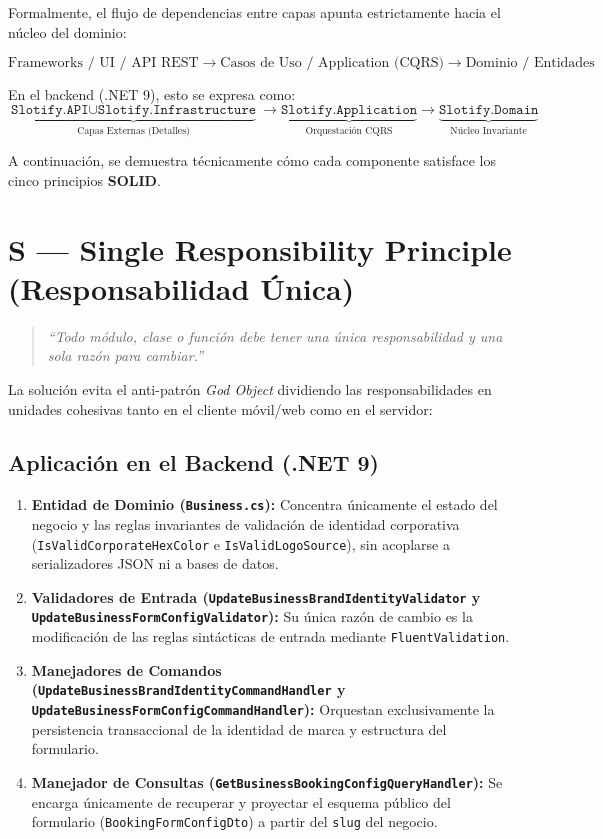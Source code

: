\documentclass[11pt,a4paper]{article}
\begin{document}
Formalmente, el flujo de dependencias entre capas apunta estrictamente hacia el núcleo del dominio:

\[
\text{Frameworks / UI / API REST} \longrightarrow \text{Casos de Uso / Application (CQRS)} \longrightarrow \text{Dominio / Entidades}
\]

En el backend (.NET 9), esto se expresa como:
\[
\underbrace{\texttt{Slotify.API} \cup \texttt{Slotify.Infrastructure}}_{\text{Capas Externas (Detalles)}}
\longrightarrow
\underbrace{\texttt{Slotify.Application}}_{\text{Orquestación CQRS}}
\longrightarrow
\underbrace{\texttt{Slotify.Domain}}_{\text{Núcleo Invariante}}
\]

A continuación, se demuestra técnicamente cómo cada componente satisface los cinco principios \textbf{SOLID}.

\section{S --- Single Responsibility Principle (Responsabilidad Única)}

\begin{quote}
\textit{``Todo módulo, clase o función debe tener una única responsabilidad y una sola razón para cambiar.''}
\end{quote}

La solución evita el anti-patrón \textit{God Object} dividiendo las responsabilidades en unidades cohesivas tanto en el cliente móvil/web como en el servidor:

\subsection{Aplicación en el Backend (.NET 9)}
\begin{enumerate}[label=\textbf{\arabic*.}]
    \item \textbf{Entidad de Dominio (\texttt{Business.cs}):} Concentra únicamente el estado del negocio y las reglas invariantes de validación de identidad corporativa (\texttt{IsValidCorporateHexColor} e \texttt{IsValidLogoSource}), sin acoplarse a serializadores JSON ni a bases de datos.
    \item \textbf{Validadores de Entrada (\texttt{UpdateBusinessBrandIdentityValidator} y \texttt{UpdateBusinessFormConfigValidator}):} Su única razón de cambio es la modificación de las reglas sintácticas de entrada mediante \texttt{FluentValidation}.
    \item \textbf{Manejadores de Comandos (\texttt{UpdateBusinessBrandIdentityCommandHandler} y \texttt{UpdateBusinessFormConfigCommandHandler}):} Orquestan exclusivamente la persistencia transaccional de la identidad de marca y estructura del formulario.
    \item \textbf{Manejador de Consultas (\texttt{GetBusinessBookingConfigQueryHandler}):} Se encarga únicamente de recuperar y proyectar el esquema público del formulario (\texttt{BookingFormConfigDto}) a partir del \texttt{slug} del negocio.
\end{enumerate}
\end{document}
